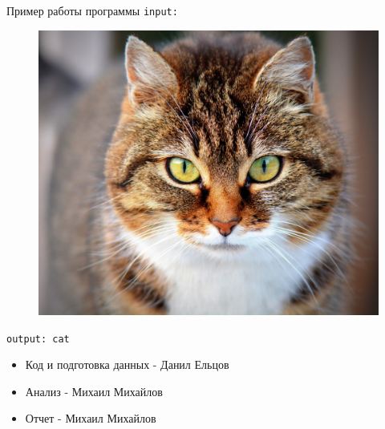 \documentclass{article}
\begin{document}
Пример работы программы
\newpage
\texttt{input:}
\begin{figure}[h!]
    \centering
    \includegraphics[scale=0.1]{input.png}
\end{figure}

\texttt{output: cat}


\begin{itemize}
    \item Код и подготовка данных - Данил Ельцов
    \item Анализ - Михаил Михайлов
    \item Отчет - Михаил Михайлов
\end{itemize}
\end{document}
